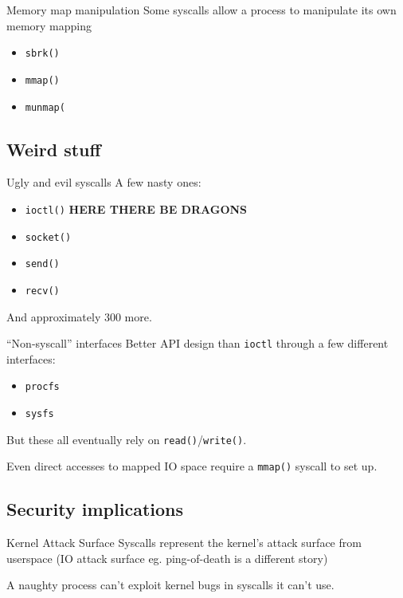 \documentclass[handout]{beamer}
\begin{document}
\begin{frame}{Memory map manipulation}
Some syscalls allow a process to manipulate its own memory mapping
\begin{itemize}
 \item \texttt{sbrk()}
 \item \texttt{mmap()}
 \item \texttt{munmap(}
\end{itemize}

\end{frame}

 
\subsection{Weird stuff}
\begin{frame}{Ugly and evil syscalls}
A few nasty ones:
\begin{itemize}
 \item \texttt{ioctl()} \textbf{HERE THERE BE DRAGONS}
 \item \texttt{socket()}
 \item \texttt{send()}
 \item \texttt{recv()}
\end{itemize}

And approximately 300 more.
\end{frame}

\begin{frame}{``Non-syscall'' interfaces}
 Better API design than \texttt{ioctl} through a few different interfaces:
 \begin{itemize}
  \item \texttt{procfs}
  \item \texttt{sysfs}
 \end{itemize}
 
 \pause
 But these all eventually rely on \texttt{read()}/\texttt{write()}.
 
 \pause
 Even direct accesses to mapped IO space require a \texttt{mmap()} syscall to set up.
\end{frame}
 
\subsection{Security implications}
\begin{frame}{Kernel Attack Surface}
 Syscalls represent the kernel's attack surface from userspace (IO attack surface eg. ping-of-death is a different story)
 
 A naughty process can't exploit kernel bugs in syscalls it can't use.
\end{frame}
\end{document}
